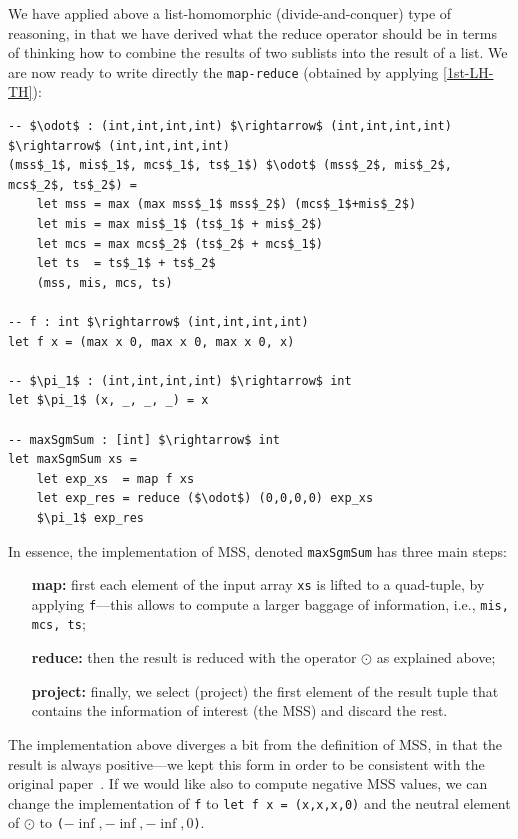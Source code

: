 \documentclass[acmsmall,review]{acmart}\settopmatter{printfolios=true,printccs=false,printacmref=false}
\begin{document}
We have applied above a list-homomorphic (divide-and-conquer) type of
reasoning, in that we have derived what the reduce operator should be
in terms of thinking how to combine the results of two sublists into
the result of a list. We are now ready to write directly the
\lstinline{map-reduce} (obtained by applying \cref{1st-LH-TH}):

\begin{lstlisting}[mathescape=true]
-- $\odot$ : (int,int,int,int) $\rightarrow$ (int,int,int,int) $\rightarrow$ (int,int,int,int)
(mss$_1$, mis$_1$, mcs$_1$, ts$_1$) $\odot$ (mss$_2$, mis$_2$, mcs$_2$, ts$_2$) =
    let mss = max (max mss$_1$ mss$_2$) (mcs$_1$+mis$_2$)
    let mis = max mis$_1$ (ts$_1$ + mis$_2$)
    let mcs = max mcs$_2$ (ts$_2$ + mcs$_1$)
    let ts  = ts$_1$ + ts$_2$
    (mss, mis, mcs, ts)

-- f : int $\rightarrow$ (int,int,int,int)
let f x = (max x 0, max x 0, max x 0, x)

-- $\pi_1$ : (int,int,int,int) $\rightarrow$ int
let $\pi_1$ (x, _, _, _) = x

-- maxSgmSum : [int] $\rightarrow$ int
let maxSgmSum xs = 
    let exp_xs  = map f xs
    let exp_res = reduce ($\odot$) (0,0,0,0) exp_xs
    $\pi_1$ exp_res 
\end{lstlisting}\vspace{-2ex}

In essence, the implementation of MSS, denoted {\tt maxSgmSum} 
has three main steps:
\begin{itemize}
    \item[\bf{map:}] first each element of the input array {\tt xs} is lifted
            to a quad-tuple, by applying {\tt f}---this allows to compute a
            larger baggage of information, i.e., {\tt mis, mcs, ts};
    \item[\bf{reduce:}] then the result is reduced with the operator $\odot$
            as explained above;
    \item[\bf{project:}] finally, we select (project) the first element of
            the result tuple that contains the information of interest (the MSS)
            and discard the rest.
\end{itemize}

The implementation above diverges a bit from the definition of MSS,
in that the result is always positive---we kept this form in order 
to be consistent with the original paper~\cite{ColeNearHom}.  If
we would like also to compute negative MSS values, we can change
the implementation of {\tt f} to
\lstinline{let f x = (x,x,x,0)} and the neutral element of $\odot$
to {\tt($-\inf, -\inf, -\inf, 0$)}.
\end{document}
